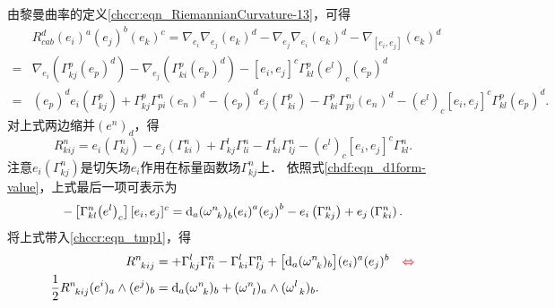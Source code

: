 由黎曼曲率的定义\eqref{chccr:eqn_RiemannianCurvature-13}，可得
\begin{align*}
    &R_{cab}^d{\left( {{e_i}} \right)^a}{\left( {{e_j}} \right)^b}{\left( {{e_k}} \right)^c}
    = {\nabla _{{e_i}}}{\nabla _{{e_j}}}{\left( {{e_k}} \right)^d}
    - {\nabla _{{e_j}}}{\nabla _{{e_i}}}{\left( {{e_k}} \right)^d}
    - {\nabla _{[{e_i},{e_j}]}}{\left( {{e_k}} \right)^d} \\
    =&  {\nabla _{{e_i}}}\left( {\Gamma _{kj}^p{{\left( {{e_p}} \right)}^d}} \right)
    - {\nabla _{{e_j}}}\left( {\Gamma _{ki}^p{{\left( {{e_p}} \right)}^d}} \right)
    - {[{e_i},{e_j}]^c}\Gamma _{kl}^p{\left( {{e^l}} \right)_c}{\left( {{e_p}} \right)^d} \\
    =& {\left( {{e_p}} \right)^d}{e_i}\left( {\Gamma _{kj}^p} \right)
    + \Gamma _{kj}^p\Gamma _{pi}^n{\left( {{e_n}} \right)^d}
    - {\left( {{e_p}} \right)^d}{e_j}\left( {\Gamma _{ki}^p} \right)
    - \Gamma _{ki}^p\Gamma _{pj}^n{\left( {{e_n}} \right)^d}
    - {\left( {{e^l}} \right)_c}{[{e_i},{e_j}]^c}\Gamma _{kl}^p{\left( {{e_p}} \right)^d} .
\end{align*}
对上式两边缩并$(e^n)_d$，得
\begin{equation}\label{chccr:eqn_tmp1}
    R_{kij}^n = {e_i} ( {\Gamma _{kj}^n} ) - {e_j}( {\Gamma _{ki}^n} )
    + \Gamma _{kj}^l\Gamma _{li}^n - \Gamma _{ki}^l\Gamma _{lj}^n
    - {{( {{e^l}} )}_c}{{[{e_i},{e_j}]}^c}\Gamma _{kl}^n .
\end{equation}
注意${e_i} ( {\Gamma _{kj}^n} )$是切矢场${e_i}$作用在标量函数场${\Gamma _{kj}^n}$上．
依照式\eqref{chdf:eqn_d1form-value}，上式最后一项可表示为
\begin{align}
    - \left[ {\Gamma _{kl}^n{{\left( {{e^l}} \right)}_c}} \right]{[{e_i},{e_j}]^c}
    = {{\text{d}}_a}{\left( {\omega _{\hphantom{a} k}^n} \right)_b}{\left( {{e_i}} \right)^a}
    {\left( {{e_j}} \right)^b} - {e_i}\left( {\Gamma _{kj}^n} \right)
    + {e_j}\left( {\Gamma _{ki}^n} \right) .
\end{align}
将上式带入\eqref{chccr:eqn_tmp1}，得
\begin{align}
    R_{\hphantom{a} kij}^{n} &= + \Gamma _{kj}^l\Gamma _{li}^n - \Gamma _{ki}^l\Gamma _{lj}^n +
    \bigl[{\rm d}_a (\omega_{\hphantom{a} k}^n)_b \bigr] (e_i)^a (e_j)^b
    {\quad \color{red} \Leftrightarrow } \label{chccr:eqn_Cartan-Structure-II-comp} \\
    \frac{1}{2}R_{\hphantom{a} kij}^n (e^i)_a \wedge (e^j)_b
    &=  {\rm d}_a ( \omega _{\hphantom{a} k} ^n  )_b  + ( \omega _{\hphantom{a} l}^n )_a 
    \wedge ( \omega _{\hphantom{a} k}^l )_b .  \label{chccr:eqn_Cartan-Structure-II}
\end{align}
